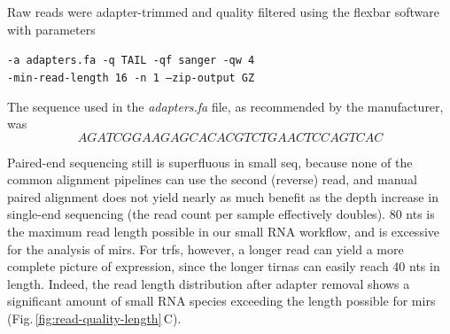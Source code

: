 \begin{method}

Raw reads were adapter-trimmed and quality filtered using the flexbar software\cite{Roehr2017} with parameters

\begin{center}\texttt{-a adapters.fa -q TAIL -qf sanger -qw 4 \\-min-read-length 16 -n 1 --zip-output GZ}\end{center} 

The sequence used in the \textit{adapters.fa} file, as recommended by the manufacturer, was $$AGATCGGAAGAGCACACGTCTGAACTCCAGTCAC$$ 

Paired-end sequencing still is superfluous in small \ac{seq}, because none of the common alignment pipelines can use the second (reverse) read, and manual paired alignment does not yield nearly as much benefit as the depth increase in single-end sequencing (the read count per sample effectively doubles). 80 \acp{nt} is the maximum read length possible in our small RNA workflow, and is excessive for the analysis of \acp{mir}. For \aclp{trf}, however, a longer read can yield a more complete picture of expression, since the longer \acp{tirna} can easily reach 40 \acp{nt} in length. Indeed, the read length distribution after adapter removal shows a significant amount of small RNA species exceeding the length possible for \acp{mir} (Fig.\,\ref{fig:read-quality-length}\,C).   

\end{method}


